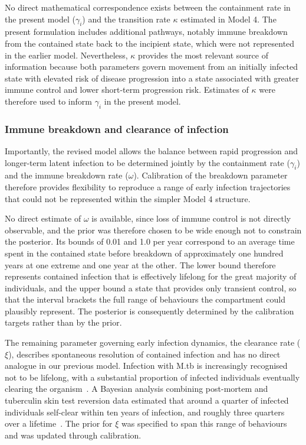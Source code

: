 No direct mathematical correspondence exists between the containment rate in the present model (\(\gamma_i\)) and the transition rate \(\kappa\) estimated in Model 4. The present formulation includes additional pathways, notably immune breakdown from the contained state back to the incipient state, which were not represented in the earlier model. Nevertheless, \(\kappa\) provides the most relevant source of information because both parameters govern movement from an initially infected state with elevated risk of disease progression into a state associated with greater immune control and lower short-term progression risk. Estimates of \(\kappa\) were therefore used to inform \(\gamma_i\) in the present model.

\subsubsection{Immune breakdown and clearance of infection}

Importantly, the revised model allows the balance between rapid progression and longer-term latent infection to be determined jointly by the containment rate (\(\gamma_i\)) and the immune breakdown rate (\(\omega\)). Calibration of the breakdown parameter therefore provides flexibility to reproduce a range of early infection trajectories that could not be represented within the simpler Model 4 structure.

No direct estimate of \(\omega\) is available, since loss of immune control is not directly observable, and the prior was therefore chosen to be wide enough not to constrain the posterior. Its bounds of 0.01 and 1.0 per year correspond to an average time spent in the contained state before breakdown of approximately one hundred years at one extreme and one year at the other. The lower bound therefore represents contained infection that is effectively lifelong for the great majority of individuals, and the upper bound a state that provides only transient control, so that the interval brackets the full range of behaviours the compartment could plausibly represent. The posterior is consequently determined by the calibration targets rather than by the prior.

The remaining parameter governing early infection dynamics, the clearance rate (\(\xi\)), describes spontaneous resolution of contained infection and has no direct analogue in our previous model. Infection with M.tb is increasingly recognised not to be lifelong, with a substantial proportion of infected individuals eventually clearing the organism~\cite{behr2019}. A Bayesian analysis combining post-mortem and tuberculin skin test reversion data estimated that around a quarter of infected individuals self-clear within ten years of infection, and roughly three quarters over a lifetime~\cite{emery2021}. The prior for \(\xi\) was specified to span this range of behaviours and was updated through calibration.

